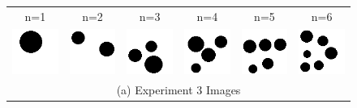 \documentclass[letterpaper]{article} %
\begin{document}
\begin{figure}[!htbp]%
\centering
\footnotesize 
\begin{tabular}{cccccc}
\multicolumn{1}{c}{n=1} \hspace{-12pt} &  
\multicolumn{1}{c}{n=2} \hspace{-12pt} & 
\multicolumn{1}{c}{n=3} \hspace{-12pt} & 
\multicolumn{1}{c}{n=4} \hspace{-12pt} & 
\multicolumn{1}{c}{n=5} \hspace{-12pt} & 
\multicolumn{1}{c}{n=6} \\

\multicolumn{1}{c}{\includegraphics[width=0.125\linewidth]{images/swap_1.png}} \hspace{-12pt} &  
\multicolumn{1}{c}{\includegraphics[width=0.125\linewidth]{images/swap_2.png}} \hspace{-12pt} & 
\multicolumn{1}{c}{\includegraphics[width=0.125\linewidth]{images/swap_3.png}} \hspace{-12pt} & 
\multicolumn{1}{c}{\includegraphics[width=0.125\linewidth]{images/swap_4.png}} \hspace{-12pt} & 
\multicolumn{1}{c}{\includegraphics[width=0.125\linewidth]{images/swap_5.png}} \hspace{-12pt} & 
\multicolumn{1}{c}{\includegraphics[width=0.125\linewidth]{images/swap_6.png}} \\ 
\multicolumn{6}{c}{(a) Experiment 3 Images} \\


\end{tabular}
\end{figure}
\end{document}

